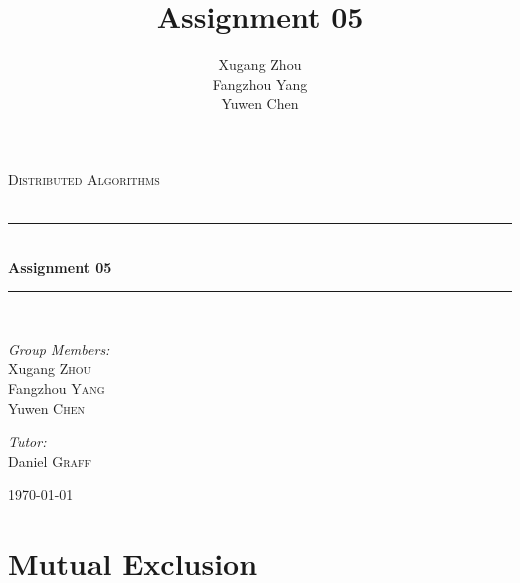 \documentclass[a4paper, 14pt]{article}
\title{\bf Assignment 05}
\author{Xugang Zhou \\ Fangzhou Yang \\ Yuwen Chen}
\newcommand{\HRule}{\rule{\linewidth}{0.5mm}}
\begin{document}
\begin{titlepage}
\begin{center}
\vfill
\textsc{\LARGE Distributed Algorithms}\\[1.5cm]
\textsc{\Large }\\[0.5cm]

\HRule \\[0.4cm]
{\huge \bfseries Assignment 05}\\[0.4cm]
\HRule \\[1.5cm]
\begin{minipage}{0.4\textwidth}
\begin{flushleft} \large
\emph{Group Members:}\\
Xugang \textsc{Zhou}\\
Fangzhou \textsc{Yang}\\
Yuwen \textsc{Chen}
\end{flushleft}
\end{minipage}
\begin{minipage}{0.4\textwidth}
\begin{flushright} \large
\emph{Tutor:} \\
Daniel \textsc{Graff}\\
\end{flushright}
\end{minipage}
\vfill
{\large \today}\\
\end{center}
\end{titlepage}
\thispagestyle{fancy}

\section{Mutual Exclusion}
\end{document}
